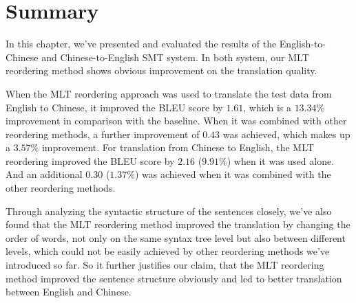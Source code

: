 \section{Summary}
\label{ch:Evaluation:sec:Conclusion}

In this chapter, we've presented and evaluated the results of the English-to-Chinese and Chinese-to-English \ac{SMT} system. In both system, our \ac{MLT} reordering method shows obvious improvement on the translation quality.

When the \ac{MLT} reordering approach was used to translate the test data from English to Chinese, it improved the \ac{BLEU} score by $1.61$, which is a $13.34\%$ improvement in comparison with the baseline. When it was combined with other reordering methods, a further improvement of $0.43$ was achieved, which makes up a $3.57\%$ improvement. For translation from Chinese to English, the 
\ac{MLT} reordering improved the \ac{BLEU} score by $2.16$ ($9.91\%$) when it was used alone. And an additional $0.30$ ($1.37\%$) was achieved when it was combined with the other reordering methods.

Through analyzing the syntactic structure of the sentences closely, we've also found that the \ac{MLT} reordering method improved the translation by changing the order of words, not only on the same syntax tree level but also between different levels, which could not be easily achieved by other reordering methods we've introduced so far. So it further justifies our claim, that the \ac{MLT} reordering method improved the sentence structure obviously and led to better translation between English and Chinese.
